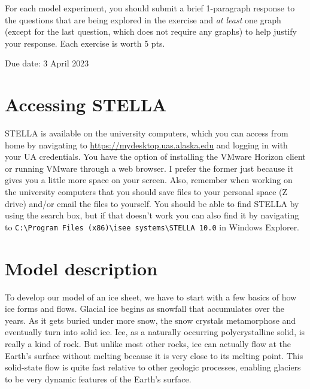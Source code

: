 \documentclass[11pt,letterpaper]{article}
\begin{document}
For each model experiment, you should submit a brief 1-paragraph response to the questions that are being explored in the exercise and \textit{at least} one graph (except for the last question, which does not require any graphs) to help justify your response. Each exercise is worth 5 pts.

Due date: 3 April 2023

\section{Accessing STELLA}
STELLA is available on the university computers, which you can access from home by navigating to \url{https://mydesktop.uas.alaska.edu} and logging in with your UA credentials. You have the option of installing the VMware Horizon client or running VMware through a web browser. I prefer the former just because it gives you a little more space on your screen. Also, remember when working on the university computers that you should save files to your personal space (Z drive) and/or email the files to yourself. You should be able to find STELLA by using the search box, but if that doesn't work you can also find it by navigating to \verb+C:\Program Files (x86)\isee systems\STELLA 10.0+ in Windows Explorer.

\section{Model description}
To develop our model of an ice sheet, we have to start with a few basics of how ice forms and flows. Glacial ice begins as snowfall that accumulates over the years. As it gets buried under more snow, the snow crystals metamorphose and eventually turn into solid ice. Ice, as a naturally occurring polycrystalline solid, is really a kind of rock. But unlike most other rocks, ice can actually flow at the Earth's surface without melting because it is very close to its melting point. This solid-state flow is quite fast relative to other geologic processes, enabling glaciers to be very dynamic features of the Earth's surface.
\end{document}
